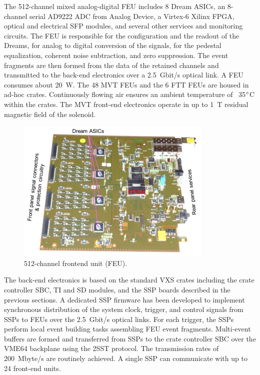 The 512-channel mixed analog-digital FEU includes 8 Dream ASICs, an 8-channel serial AD9222 ADC from Analog Device, a Virtex-6 Xilinx FPGA, optical and electrical SFP modules, and several other services and monitoring circuits. The FEU is responsible for the configuration and the readout of the Dreams, for analog to digital conversion of the signals, for the pedestal equalization, coherent noise subtraction, and zero suppression. The event fragments are then formed from the data of the retained channels and transmitted to the back-end electronics over a 2.5~Gbit/s optical link. A FEU consumes about 20~W. The 48 MVT FEUs and the 6 FTT FEUs are housed in ad-hoc crates. Continuously flowing air ensures an ambient temperature of ~35$\degree$C within the crates. The MVT front-end electronics operate in up to 1~T residual magnetic field of the solenoid.

\begin{figure}[hbt]
	\centering
	\includegraphics[width=1.0\columnwidth,keepaspectratio]{img/mvt2.png}
	\caption{512-channel frontend unit (FEU).}
	\label{fig:mvt2}
\end{figure}

The back-end electronics is based on the standard VXS crates including the crate controller SBC, TI and SD modules, and the SSP boards described in the previous sections. A dedicated SSP firmware has been developed to implement synchronous distribution of the system clock, trigger, and control signals from SSPs to FEUs over the 2.5~Gbit/s optical links. For each trigger, the SSPs perform local event building tasks assembling FEU event fragments. Multi-event buffers are formed and transferred from SSPs to the crate controller SBC over the VME64 backplane using the 2SST protocol. The transmission rates of 200~Mbyte/s are routinely achieved. A single SSP can communicate with up to 24 front-end units.

